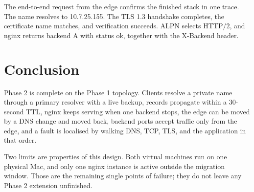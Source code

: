 \documentclass[11pt,a4paper]{article}
\begin{document}
The end-to-end request from the edge confirms the finished stack in one trace.
The name resolves to 10.7.25.155. The TLS 1.3 handshake completes, the certificate
name matches, and verification succeeds. ALPN selects HTTP/2, and nginx returns
backend A with status ok, together with the X-Backend header.

\section{Conclusion}
Phase 2 is complete on the Phase 1 topology. Clients resolve a private name through a
primary resolver with a live backup, records propagate within a 30-second TTL, nginx
keeps serving when one backend stops, the edge can be moved by a DNS change and moved
back, backend ports accept traffic only from the edge, and a fault is localised by
walking DNS, TCP, TLS, and the application in that order.

Two limits are properties of this design. Both virtual machines run on one physical
Mac, and only one nginx instance is active outside the migration window. Those are
the remaining single points of failure; they do not leave any Phase 2 extension
unfinished.
\end{document}
